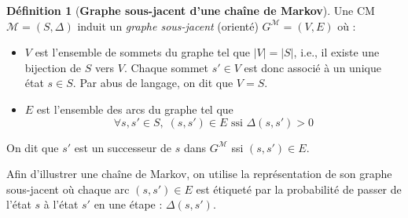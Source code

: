 \documentclass[12pt,a4paper]{report}
\theoremstyle{definition}%
\newtheorem{definition}{Définition}[chapter]
\theoremstyle{remark}
\newcommand{\ssi}{ssi }
\newcommand{\ie}{i.e., }
\let\labelitemi\labelitemii
\begin{document}
\begin{definition}[\textbf{Graphe sous-jacent d'une chaîne de Markov}]\label{markov-underlying-graph}
	Une CM $\mathcal{M} = (S, \Delta)$ induit un \textit{graphe sous-jacent} (orienté) $G^\mathcal{M} = (V, E)$ où :
	\begin{itemize}
		\renewcommand{\labelitemi}{\tiny$\bullet$}
		\item $V$ est l'ensemble de sommets du graphe tel que $|V| = |S|$, \ie il existe une bijection de $S$ vers $V$. Chaque sommet $s' \in V$ est donc associé à un unique état $s \in S$. Par abus de langage, on dit que $V = S$.
		\item $E$ est l'ensemble des arcs du graphe tel que \[ \forall s, s' \in S, \; (s, s') \in E \text{ \ssi} \Delta(s, s') > 0\]
	\end{itemize}
	On dit que $s'$ est un successeur de $s$ dans $G^\mathcal{M}$ \ssi $(s, s') \in E$.
\end{definition}

Afin d'illustrer une chaîne de Markov, on utilise la représentation de son graphe sous-jacent où
chaque arc $(s, s') \in E$ est étiqueté par la probabilité de passer de l'état $s$ à l'état $s'$ en une étape : $\Delta(s, s')$.
\end{document}

